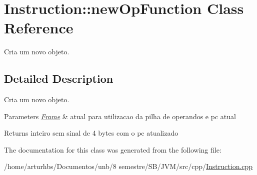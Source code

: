 \hypertarget{classInstruction_1_1newOpFunction}{}\section{Instruction\+:\+:new\+Op\+Function Class Reference}
\label{classInstruction_1_1newOpFunction}


Cria um novo objeto.  




\subsection{Detailed Description}
Cria um novo objeto. 


\begin{DoxyParams}{Parameters}
{\em \hyperlink{classFrame}{Frame}} & atual para utilizacao da pilha de operandos e pc atual \\
\hline
\end{DoxyParams}
\begin{DoxyReturn}{Returns}
inteiro sem sinal de 4 bytes com o pc atualizado 
\end{DoxyReturn}


The documentation for this class was generated from the following file\+:\begin{DoxyCompactItemize}
\item 
/home/arturhbs/\+Documentos/unb/8 semestre/\+S\+B/\+J\+V\+M/src/cpp/\hyperlink{Instruction_8cpp}{Instruction.\+cpp}\end{DoxyCompactItemize}
